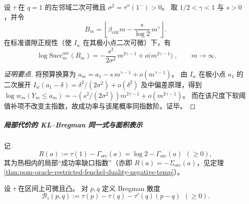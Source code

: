 \begin{proposition}\label{prop:pom-oracle-critical-window-mdp}
设 \(\tau\) 在 \(q=1\) 的左邻域二次可微且 \(\sigma^2=\tau''(1^-)>0\)。
取 \(1/2<\gamma<1\) 与 \(s>0\)，并令
\[
B_m=\left\lfloor \beta_{\mathrm{crit}}m-\frac{s}{\log 2}\,m^\gamma\right\rfloor.
\]
在标准谱隙正规性（使 \(I_w\) 在其极小点二次可微）下，有
\[
\boxed{\;
\log \mathrm{Succ}^{\mathrm{orc}}_m(B_m)
=-\frac{s^2}{2\sigma^2}\,m^{2\gamma-1}+o\!\bigl(m^{2\gamma-1}\bigr)\; } ,
\qquad m\to\infty.
\]
\end{proposition}
\begin{proof}[证明要点]
将预算换算为 \(a_m=a_1-s\,m^{\gamma-1}+o(m^{\gamma-1})\)。
由 \(I_w\) 在极小点 \(a_1\) 的二次展开 \(I_w(a_1-\delta)=\delta^2/(2\sigma^2)+o(\delta^2)\) 及中偏差原理，得到
\(
\log w_m(Y_m\le a_m)=-(s^2/(2\sigma^2))m^{2\gamma-1}+o(m^{2\gamma-1})
\)。
而在该尺度下软阈值补项不改变主指数，故成功率与该尾概率同指数阶。证毕。
\end{proof}

\subparagraph{局部代价的 KL--Bregman 同一式与面积表示}
记
\[
R(a):=\tau(1)-\Gamma_{\mathrm{orc}}(a)=\log 2-\Gamma_{\mathrm{orc}}(a)\ \ (\ge 0),
\]
其为热相内的局部“成功率缺口指数”（亦即 \(R(a)=-\Sigma_{\mathrm{orc}}(a)\)，见定理 \ref{thm:pom-oracle-restricted-fenchel-duality-negative-temp}）。

\begin{definition}\label{def:pom-bregman-divergence-pressure}
设 \(\tau\) 在区间上可微且凸。
对 \(p,q\) 定义 Bregman 散度
\[
\mathcal{B}_{\tau}(p,q):=\tau(p)-\tau(q)-\tau'(q)(p-q)\ \ (\ge 0).
\]
\end{definition}

